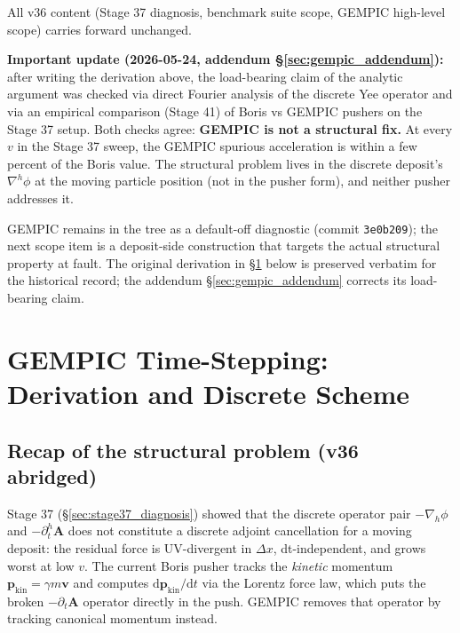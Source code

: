 \documentclass[11pt,a4paper]{article}
\newcommand{\vv}[1]{\mathbf{#1}}
\newcommand{\dd}{\mathrm{d}}
\begin{document}
All v36 content (Stage 37 diagnosis, benchmark suite scope, GEMPIC
high-level scope) carries forward unchanged.

\textbf{Important update (2026-05-24, addendum
§\ref{sec:gempic_addendum}):} after writing the derivation above,
the load-bearing claim of the analytic argument was checked via
direct Fourier analysis of the discrete Yee operator and via an
empirical comparison (Stage 41) of Boris vs GEMPIC pushers on the
Stage 37 setup.  Both checks agree: \textbf{GEMPIC is not a
structural fix.}  At every $v$ in the Stage 37 sweep, the GEMPIC
spurious acceleration is within a few percent of the Boris value.
The structural problem lives in the discrete deposit's $\nabla^h\phi$
at the moving particle position (not in the pusher form), and
neither pusher addresses it.

GEMPIC remains in the tree as a default-off diagnostic (commit
\texttt{3e0b209}); the next scope item is a deposit-side
construction that targets the actual structural property at fault.
The original derivation in §\ref{sec:gempic_derivation} below is
preserved verbatim for the historical record; the addendum
§\ref{sec:gempic_addendum} corrects its load-bearing claim.

\newpage

\section{GEMPIC Time-Stepping: Derivation and Discrete Scheme}
\label{sec:gempic_derivation}

\subsection{Recap of the structural problem (v36 abridged)}

Stage 37 (\S\ref{sec:stage37_diagnosis}) showed that the discrete
operator pair $-\nabla_h\phi$ and $-\partial^h_t\vv{A}$ does not
constitute a discrete adjoint cancellation for a moving deposit:
the residual force is UV-divergent in $\Delta x$, dt-independent,
and grows worst at low $v$.  The current Boris pusher tracks the
\emph{kinetic} momentum $\vv{p}_{\mathrm{kin}} = \gamma m \vv{v}$
and computes $\dd \vv{p}_{\mathrm{kin}}/\dd t$ via the Lorentz
force law, which puts the broken $-\partial_t\vv{A}$ operator
directly in the push.  GEMPIC removes that operator by tracking
canonical momentum instead.
\end{document}
